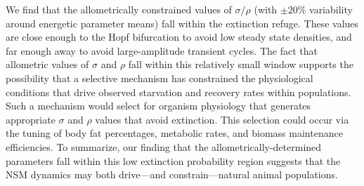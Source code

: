 \documentclass{pnastwo}
\begin{document}
\begin{article}
We find that the allometrically constrained values of $\sigma/\rho$ (with
$\pm 20\%$ variability around energetic parameter means) fall within the
extinction refuge. These values are close enough to the Hopf bifurcation to
avoid low steady state densities, and far enough away to avoid
large-amplitude transient cycles. The fact that allometric values of $\sigma$
and $\rho$ fall within this relatively small window supports the possibility
that a selective mechanism has constrained the physiological conditions that
drive observed starvation and recovery rates within populations.  Such a
mechanism would select for organism physiology that generates appropriate
$\sigma$ and $\rho$ values that avoid extinction.  This selection could occur
via the tuning of body fat percentages, metabolic rates, and biomass
maintenance efficiencies.
To summarize, our finding that the allometrically-determined parameters fall within this low extinction probability region suggests that the NSM dynamics may both drive---and constrain---natural animal populations.\\







\end{article}
\end{document}

